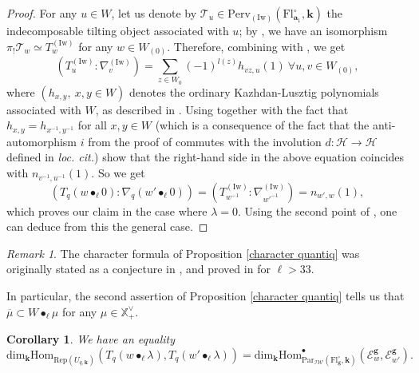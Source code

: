 \documentclass[11pt]{amsart}
\theoremstyle{plain}
\newtheorem{coro}[thm]{Corollary}
\theoremstyle{remark}
\newtheorem{rem}[thm]{Remark}
\numberwithin{equation}{section}
\begin{document}
\begin{proof}
	For any $u\in W$, let us denote by $\mathscr{T}_u\in \mathrm{Perv}_{(\mathrm{Iw})}(\mathrm{Fl}_{\mathbf{a}_1}^\circ,\mathbf{k})$ the indecomposable tilting object associated with $u$; by \cite[Proposition 3.4.1]{yun2009weights}, we have an isomorphism $\pi_!\mathscr{T}_w\simeq T^{(\mathrm{Iw})}_{w}$ for any $w\in W_{(0)}$. Therefore, combining \cite[(3.4.1)]{yun2009weights} with \cite[Theorem 5.3.1]{yun2009weights}, we get 
	$$(T^{(\mathrm{Iw})}_{u}: \nabla^{(\mathrm{Iw})}_{v})=\sum_{z\in W_0}(-1)^{l(z)}h_{vz,u}(1)~ \forall u,v\in W_{(0)}, $$
	where $(h_{x,y},~x,y\in W)$ denotes the ordinary Kazhdan-Lusztig polynomials associated with $W$, as described in \cite{Soergel1997KazhdanLusztigPA}. Using \cite[Proposition 3.4]{Soergel1997KazhdanLusztigPA} together with the fact that $h_{x,y}=h_{x^{-1},y^{-1}}$ for all $x,y\in W$ (which is a consequence of the fact that the anti-automorphism $i$ from the proof of \cite[Theorem 2.7]{Soergel1997KazhdanLusztigPA} commutes with the involution $d:\mathcal{H}\to \mathcal{H}$ defined in \textit{loc. cit.}) show that the right-hand side in the above equation coincides with $n_{v^{-1},u^{-1}}(1)$. So we get 
	$$(T_q(w\bullet_\ell0):\nabla_q(w'\bullet_\ell0))=(T^{(\mathrm{Iw})}_{w^{-1}}: \nabla^{(\mathrm{Iw})}_{w'^{-1}})=n_{w',w}(1),$$
	which proves our claim in the case where $\lambda=0$. Using the second point of \cite[Remark 7.2]{Soergel1997KazhdanLusztigPA}, one can deduce from this the general case. \end{proof}
	\begin{rem}
	The character formula of Proposition \ref{character quantiq} was originally stated as a conjecture in \cite[Conjecture 7.1]{Soergel1997KazhdanLusztigPA}, and proved in \cite{soergel1998character} for $\ell>33$.
	\end{rem}
	In particular, the second assertion of Proposition \ref{character quantiq} tells us that $\overline{\mu}\subset W\bullet_\ell\mu$ for any $\mu\in\mathbb{X}^\vee_+$.
	\begin{coro}
    We have an equality
	$$\mathrm{dim}_\mathbf{k}\mathrm{Hom}_{\mathrm{Rep}(U_{q,\mathbf{k}})}(T_q(w\bullet_\ell\lambda),T_q(w'\bullet_\ell\lambda))=\mathrm{dim}_\mathbf{k}\mathrm{Hom}^\bullet_{\mathrm{Par}_{\mathcal{IW}}(\mathrm{Fl}^{\circ}_{\mathbf{g}},\mathbf{k})}(\mathcal{E}_w^{\mathbf{g}},\mathcal{E}_{w'}^{\mathbf{g}}).$$
	\end{coro}
\end{document}

